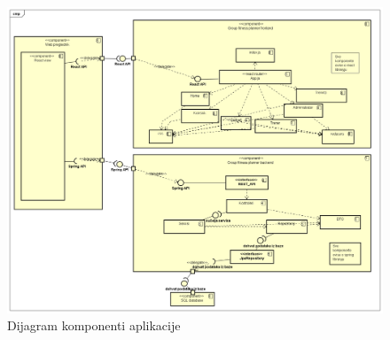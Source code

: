         \begin{figure}[H]
		    \includegraphics [scale=0.35]{./Dijagrami/Dijagram_komponenti.png}
		      \centering
		      \caption{Dijagram komponenti aplikacije}
		      \label{fig:promjene}
	   \end{figure}
